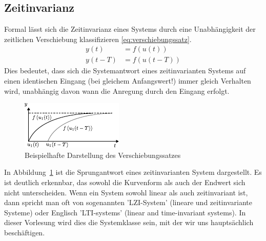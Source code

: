 \subsection{Zeitinvarianz}
%
Formal lässt sich die Zeitinvarianz eines Systems durch eine Unabhängigkeit der zeitlichen Verschiebung klassifizieren \cite{Foellinger94,Lunze10} \eqref{eq:verschiebungssatz}.
%
\begin{equation}
\begin{aligned}
y(t)&=f\left(u(t)\right)\\
y(t-T)&=f\left(u(t-T)\right)\label{eq:verschiebungssatz}
\end{aligned}
\end{equation}
%
Dies bedeutet, dass sich die Systemantwort eines zeitinvarianten Systems auf einen identischen Eingang (bei gleichem Anfangswert!) immer gleich Verhalten wird, unabhängig davon wann die Anregung durch den Eingang erfolgt.
%
\begin{figure}[h]
	\centering
	\includegraphics[width=0.55\linewidth]{Abbildungen/Modellbildung/PDF/Zeitinvariant.pdf}
	\caption{Beispielhafte Darstellung des Verschiebungssatzes}
	\label{fig:zeitinvariant}
\end{figure}
%
In Abbildung~\ref{fig:zeitinvariant} ist die Sprungantwort eines zeitinvarianten System dargestellt. Es ist deutlich erkennbar, das sowohl die Kurvenform als auch der Endwert sich nicht unterscheiden. Wenn ein System sowohl linear als  auch zeitinvariant ist, dann spricht man oft von sogenannten 'LZI-System' (lineare und zeitinvariante Systeme) oder Englisch 'LTI-systems' (linear and time-invariant systems). In dieser Vorlesung wird dies die Systemklasse sein, mit der wir uns hauptsächlich beschäftigen.
%
